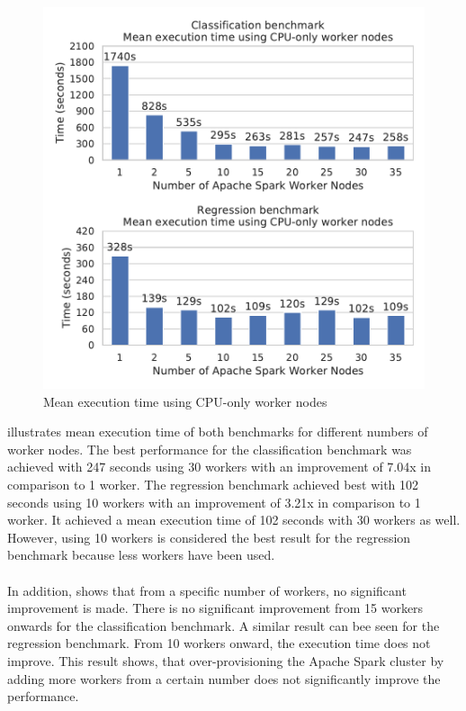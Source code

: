 \begin{figure}[h]
\centering
\includegraphics[scale=0.9]{images/07_evaluation/overall_cpu}
\caption{Mean execution time using CPU-only worker nodes}
\label{fig:07_static_results}
\end{figure}
 illustrates mean execution time of both benchmarks for different numbers of worker nodes.
The best performance for the classification benchmark was achieved with 247 seconds using 30 workers with an improvement of 7.04x in comparison to 1 worker.
The regression benchmark achieved best with 102 seconds using 10 workers with an improvement of 3.21x in comparison to 1 worker. It achieved a mean execution time of 102 seconds with 30 workers as well. However, using 10 workers is considered the best result for the regression benchmark because less workers have been used.

\paragraph{}
In addition,  shows that from a specific number of workers, no significant improvement is made.
There is no significant improvement from 15 workers onwards for the classification benchmark.
A similar result can bee seen for the regression benchmark. From 10 workers onward, the execution time does not improve.
This result shows, that over-provisioning the Apache Spark cluster by adding more workers from a certain number does not significantly improve the performance.


